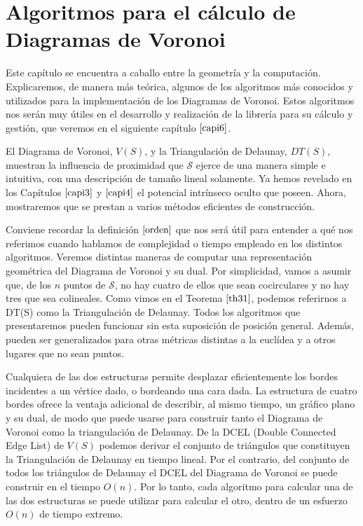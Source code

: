 \chapter{Algoritmos para el cálculo de Diagramas de Voronoi}\label{algoritmos}

Este capítulo se encuentra a caballo entre la geometría y la computación. Explicaremos, de manera más teórica, algunos de los algoritmos más conocidos y utilizados para la implementación de los Diagramas de Voronoi. Estos algoritmos nos serán muy útiles en el desarrollo y realización de la librería para su cálculo y gestión, que veremos en el siguiente capítulo $\ref{capi6}$.
\vspace{0.3cm}

El Diagrama de Voronoi, $V(S)$, y la Triangulación de Delaunay, $DT(S)$, muestran la influencia de proximidad que $\mathcal{S}$ ejerce de una manera simple e intuitiva, con una descripción de tamaño lineal solamente. Ya hemos revelado en los Capítulos $\ref{capi3}$ y $\ref{capi4}$ el potencial intrínseco oculto que poseen. Ahora, mostraremos que se prestan a varios métodos eficientes de construcción.
\vspace{0.3cm}

Conviene recordar la definición $\ref{orden}$ que nos será útil para entender a qué nos referimos cuando hablamos de complejidad o tiempo empleado en los distintos algoritmos. Veremos distintas maneras de computar una representación geométrica del Diagrama de Voronoi y su dual. Por simplicidad, vamos a asumir que, de los $n$ puntos de $\mathcal{S}$, no hay cuatro de ellos que sean cocirculares y no hay tres que sea colineales. Como vimos en el Teorema $\ref{th31}$, podemos referirnos a DT(S) como la Triangulación de Delaunay. Todos los algoritmos que presentaremos pueden funcionar sin esta suposición de posición general. Además, pueden ser generalizados para otras métricas distintas a la euclídea y a otros lugares que no sean puntos. 
\vspace{0.3cm}

Cualquiera de las dos estructuras permite desplazar eficientemente los bordes incidentes a un vértice dado, o bordeando una cara dada. La estructura de cuatro bordes ofrece la ventaja adicional de describir, al mismo tiempo, un gráfico plano y su dual, de modo que puede usarse para construir tanto el Diagrama de Voronoi como la triangulación de Delaunay. De la DCEL (Double Connected Edge List) de $V(S)$ podemos derivar el conjunto de triángulos que constituyen la Triangulación de Delaunay en tiempo lineal. Por el contrario, del conjunto de todos los triángulos de Delaunay el DCEL del Diagrama de Voronoi se puede construir en el tiempo $O(n)$. Por lo tanto, cada algoritmo para calcular una de las dos estructuras se puede utilizar para calcular el otro, dentro de un esfuerzo $O(n)$ de tiempo extremo.

